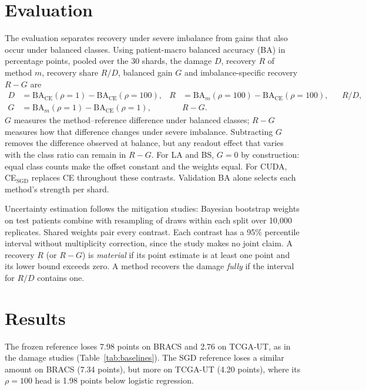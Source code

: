 \documentclass[11pt]{article}
\begin{document}
\section{Evaluation}
\label{sec:evaluation}
The evaluation separates recovery under severe imbalance from gains that also occur under balanced classes. Using patient-macro balanced accuracy (BA) in percentage points, pooled over the 30 shards, the damage $D$, recovery $R$ of method $m$, recovery share $R/D$, balanced gain $G$ and imbalance-specific recovery $R-G$ are
\begin{align}
D &= \mathrm{BA}_{\mathrm{CE}}(\rho{=}1) - \mathrm{BA}_{\mathrm{CE}}(\rho{=}100), &
R &= \mathrm{BA}_m(\rho{=}100) - \mathrm{BA}_{\mathrm{CE}}(\rho{=}100), &
&R/D,\\
G &= \mathrm{BA}_m(\rho{=}1) - \mathrm{BA}_{\mathrm{CE}}(\rho{=}1), &
&R-G.
\end{align}
$G$ measures the method--reference difference under balanced classes; $R-G$ measures how that difference changes under severe imbalance. Subtracting $G$ removes the difference observed at balance, but any readout effect that varies with the class ratio can remain in $R-G$. For LA and BS, $G=0$ by construction: equal class counts make the offset constant and the weights equal. For CUDA, CE$_\mathrm{SGD}$ replaces CE throughout these contrasts. Validation BA alone selects each method's strength per shard.

Uncertainty estimation follows the mitigation studies: Bayesian bootstrap weights on test patients \citep{rubin1981bayesian} combine with resampling of draws within each split over 10,000 replicates. Shared weights pair every contrast. Each contrast has a 95\% percentile interval without multiplicity correction, since the study makes no joint claim. A recovery $R$ (or $R-G$) is \emph{material} if its point estimate is at least one point and its lower bound exceeds zero. A method recovers the damage \emph{fully} if the interval for $R/D$ contains one.

\section{Results}
\label{sec:results}
The frozen reference loses 7.98 points on BRACS and 2.76 on TCGA-UT, as in the damage studies (Table~\ref{tab:baselines}). The SGD reference loses a similar amount on BRACS (7.34 points), but more on TCGA-UT (4.20 points), where its $\rho=100$ head is 1.98 points below logistic regression.

{\setlength{\tabcolsep}{4pt}}
\end{document}
